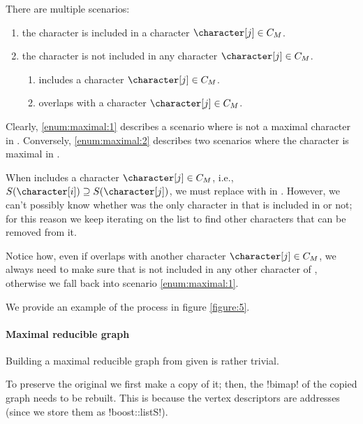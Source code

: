 There are multiple scenarios:

\begin{enumerate}[label=\textbf{S.\arabic*}, ref=S.\arabic*]
  \item \label{enum:maximal:1} the character \character[i] is included in a character $\character[j] \in \cm{}$.

  \item \label{enum:maximal:2} the character \character[i] is not included in any character $\character[j] \in \cm{}$.
  \begin{enumerate}
    \item \label{enum:maximal:2:b} \character[i] includes a character $\character[j] \in \cm{}$.

    \item \label{enum:maximal:2:a} \character[i] overlaps with a character $\character[j] \in \cm{}$.
  \end{enumerate}
\end{enumerate}

Clearly, \ref{enum:maximal:1} describes a scenario where \character[i] is not a maximal character in \grb{}.
Conversely, \ref{enum:maximal:2} describes two scenarios where the character \character[i] is maximal in \grb{}.

When \character[i] includes a character $\character[j] \in \cm{}$, i.e., $S(\character[i]) \supseteq S(\character[j])$, we must replace \character[j] with \character[i] in \cm{}.
However, we can't possibly know whether \character[j] was the only character in \cm{} that is included in \character[i] or not; for this reason we keep iterating on the list \cm{} to find other characters that can be removed from it.

Notice how, even if \character[i] overlaps with another character $\character[j] \in \cm{}$, we always need to make sure that \character[i] is not included in any other character of \cm{}, otherwise we fall back into scenario \ref{enum:maximal:1}.

We provide an example of the process in figure \ref{figure:5}.

\paragraph{Maximal reducible graph}

Building a maximal reducible graph \grbcm{} from \grb{} given \cm{} is rather trivial.

To preserve the original \grb{} we first make a copy of it; then, the !bimap! of the copied graph needs to be rebuilt.
This is because the vertex descriptors are addresses (since we store them as !boost::listS!).


